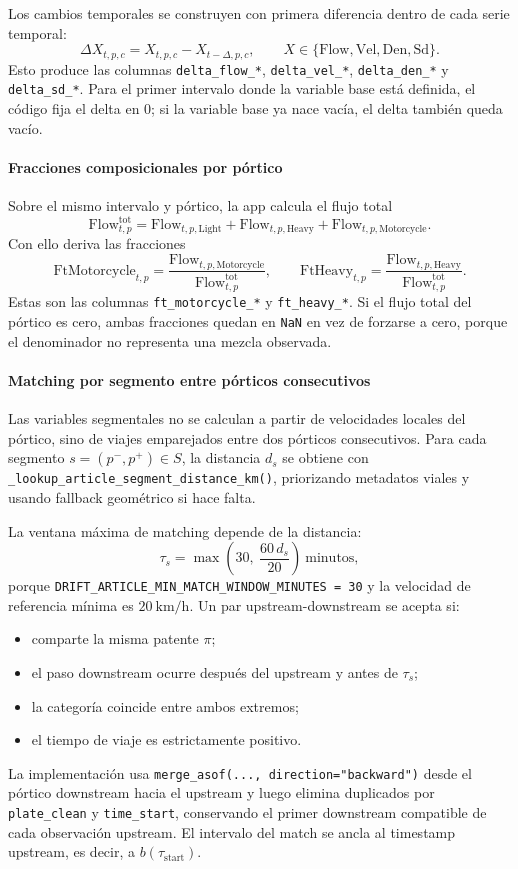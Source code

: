 Los cambios temporales se construyen con primera diferencia dentro de cada serie temporal:
\[
\Delta X_{t,p,c} = X_{t,p,c} - X_{t-\Delta,p,c},
\qquad
X \in \{\mathrm{Flow}, \mathrm{Vel}, \mathrm{Den}, \mathrm{Sd}\}.
\]
Esto produce las columnas \texttt{delta\_flow\_*}, \texttt{delta\_vel\_*}, \texttt{delta\_den\_*} y \texttt{delta\_sd\_*}. Para el primer intervalo donde la variable base est\'a definida, el c\'odigo fija el delta en \(0\); si la variable base ya nace vac\'ia, el delta tambi\'en queda vac\'io.

\paragraph{Fracciones composicionales por p\'ortico}
Sobre el mismo intervalo y p\'ortico, la app calcula el flujo total
\[
\mathrm{Flow}^{\mathrm{tot}}_{t,p}
= \mathrm{Flow}_{t,p,\mathrm{Light}}
+ \mathrm{Flow}_{t,p,\mathrm{Heavy}}
+ \mathrm{Flow}_{t,p,\mathrm{Motorcycle}}.
\]
Con ello deriva las fracciones
\[
\mathrm{FtMotorcycle}_{t,p} =
\frac{\mathrm{Flow}_{t,p,\mathrm{Motorcycle}}}{\mathrm{Flow}^{\mathrm{tot}}_{t,p}},
\qquad
\mathrm{FtHeavy}_{t,p} =
\frac{\mathrm{Flow}_{t,p,\mathrm{Heavy}}}{\mathrm{Flow}^{\mathrm{tot}}_{t,p}}.
\]
Estas son las columnas \texttt{ft\_motorcycle\_*} y \texttt{ft\_heavy\_*}. Si el flujo total del p\'ortico es cero, ambas fracciones quedan en \texttt{NaN} en vez de forzarse a cero, porque el denominador no representa una mezcla observada.

\paragraph{Matching por segmento entre p\'orticos consecutivos}
Las variables segmentales no se calculan a partir de velocidades locales del p\'ortico, sino de viajes emparejados entre dos p\'orticos consecutivos. Para cada segmento \(s=(p^{-},p^{+}) \in S\), la distancia \(d_s\) se obtiene con \texttt{\_lookup\_article\_segment\_distance\_km()}, priorizando metadatos viales y usando fallback geom\'etrico si hace falta.

La ventana m\'axima de matching depende de la distancia:
\[
\tau_s = \max\left(30,\ \frac{60\,d_s}{20}\right)\ \text{minutos},
\]
porque \texttt{DRIFT\_ARTICLE\_MIN\_MATCH\_WINDOW\_MINUTES = 30} y la velocidad de referencia m\'inima es \(20\ \mathrm{km/h}\). Un par upstream-downstream se acepta si:
\begin{itemize}[leftmargin=*]
  \item comparte la misma patente \(\pi\);
  \item el paso downstream ocurre despu\'es del upstream y antes de \(\tau_s\);
  \item la categor\'ia coincide entre ambos extremos;
  \item el tiempo de viaje es estrictamente positivo.
\end{itemize}
La implementaci\'on usa \texttt{merge\_asof(..., direction="backward")} desde el p\'ortico downstream hacia el upstream y luego elimina duplicados por \texttt{plate\_clean} y \texttt{time\_start}, conservando el primer downstream compatible de cada observaci\'on upstream. El intervalo del match se ancla al timestamp upstream, es decir, a \(b(\tau_{\mathrm{start}})\).

